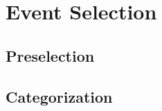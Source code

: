 \chapter{Event Selection}\label{cha:event_selection}

\section{Preselection}\label{sec:event_selection:preselection}

\section{Categorization}\label{sec:event_selection:categorization}
